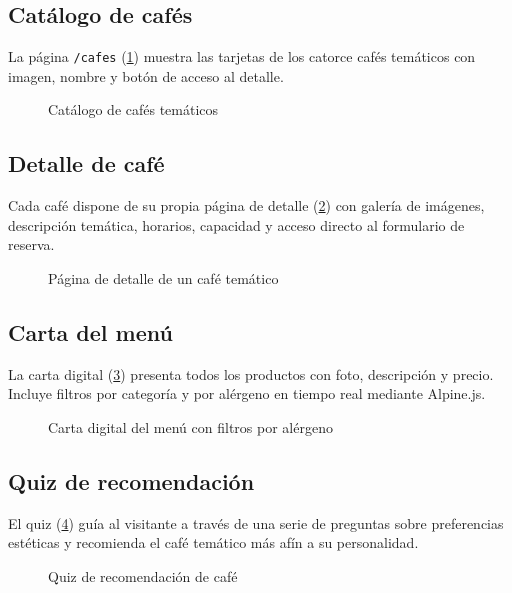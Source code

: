 \documentclass[12pt,a4paper,twoside,openright]{report}
\begin{document}
\subsection{Catálogo de cafés}
La página \texttt{/cafes} (\cref{fig:02-cafes-lista}) muestra las tarjetas de los
catorce cafés temáticos con imagen, nombre y botón de acceso al detalle.

\begin{figure}[H]
  \centering
  \fbox{\rule{0pt}{6cm}\rule{12cm}{0pt}}
  \caption{Catálogo de cafés temáticos}
  \label{fig:02-cafes-lista}
\end{figure}

\subsection{Detalle de café}
Cada café dispone de su propia página de detalle (\cref{fig:03-cafe-detalle}) con
galería de imágenes, descripción temática, horarios, capacidad y acceso directo al
formulario de reserva.

\begin{figure}[H]
  \centering
  \fbox{\rule{0pt}{6cm}\rule{12cm}{0pt}}
  \caption{Página de detalle de un café temático}
  \label{fig:03-cafe-detalle}
\end{figure}

\subsection{Carta del menú}
La carta digital (\cref{fig:04-menu-catalogo}) presenta todos los productos con
foto, descripción y precio. Incluye filtros por categoría y por alérgeno en tiempo
real mediante Alpine.js.

\begin{figure}[H]
  \centering
  \fbox{\rule{0pt}{6cm}\rule{12cm}{0pt}}
  \caption{Carta digital del menú con filtros por alérgeno}
  \label{fig:04-menu-catalogo}
\end{figure}

\subsection{Quiz de recomendación}
El quiz (\cref{fig:06-quiz-inicio}) guía al visitante a través de una serie de
preguntas sobre preferencias estéticas y recomienda el café temático más afín a su
personalidad.

\begin{figure}[H]
  \centering
  \fbox{\rule{0pt}{6cm}\rule{12cm}{0pt}}
  \caption{Quiz de recomendación de café}
  \label{fig:06-quiz-inicio}
\end{figure}
\end{document}
